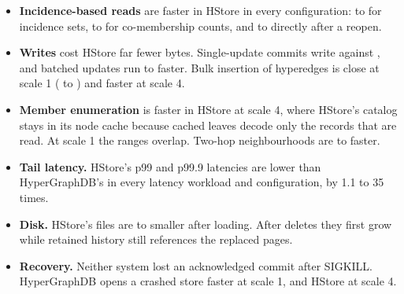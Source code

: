 \begin{itemize}
\item \textbf{Incidence-based reads} are faster in HStore in every configuration:  to  for incidence sets,  to  for co-membership counts, and  to  directly after a reopen.
\item \textbf{Writes} cost HStore far fewer bytes. Single-update commits write  against , and batched updates run  to  faster. Bulk insertion of hyperedges is close at scale 1 ( to ) and  faster at scale 4.
\item \textbf{Member enumeration} is  faster in HStore at scale 4, where HStore's catalog stays in its node cache because cached leaves decode only the records that are read. At scale 1 the ranges overlap. Two-hop neighbourhoods are  to  faster.
\item \textbf{Tail latency.} HStore's p99 and p99.9 latencies are lower than HyperGraphDB's in every latency workload and configuration, by 1.1 to 35 times.
\item \textbf{Disk.} HStore's files are  to  smaller after loading. After deletes they first grow while retained history still references the replaced pages.
\item \textbf{Recovery.} Neither system lost an acknowledged commit after SIGKILL. HyperGraphDB opens a crashed store faster at scale 1, and HStore at scale 4.
\end{itemize}
